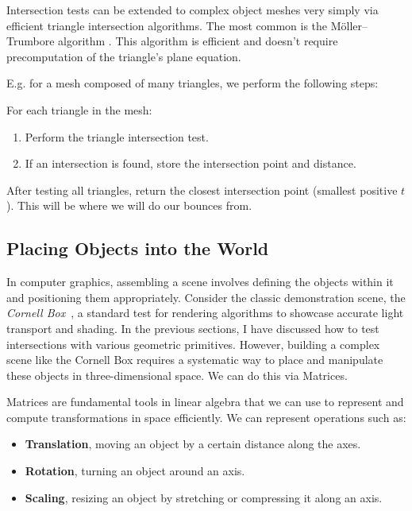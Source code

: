 \documentclass[12pt]{article}
\begin{document}
Intersection tests can be extended to complex object meshes very simply via efficient triangle intersection algorithms. The most common is the Möller–Trumbore algorithm \cite{trumboreintersection}. This algorithm is efficient and doesn't require precomputation of the triangle's plane equation.

E.g. for a mesh composed of many triangles, we perform the following steps:

For each triangle in the mesh:
\begin{enumerate}
    \item Perform the triangle intersection test.
    \item If an intersection is found, store the intersection point and distance.
\end{enumerate}

After testing all triangles, return the closest intersection point (smallest positive \(t\)). This will be where we will do our bounces from.

\subsection{Placing Objects into the World}

In computer graphics, assembling a scene involves defining the objects within it and positioning them appropriately. Consider the classic demonstration scene, the \textit{Cornell Box}~\cite{cornellbox}, a standard test for rendering algorithms to showcase accurate light transport and shading.
In the previous sections, I have discussed how to test intersections with various geometric primitives. However, building a complex scene like the Cornell Box requires a systematic way to place and manipulate these objects in three-dimensional space. We can do this via Matrices.

Matrices are fundamental tools in linear algebra that we can use to represent and compute transformations in space efficiently. We can represent operations such as:

\begin{itemize}
    \item \textbf{Translation}, moving an object by a certain distance along the axes.
    \item \textbf{Rotation}, turning an object around an axis.
    \item \textbf{Scaling}, resizing an object by stretching or compressing it along an axis.
\end{itemize}
\end{document}
